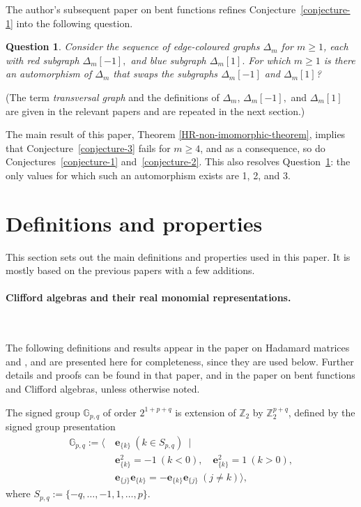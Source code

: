 \documentclass[12pt,a4paper]{article}
\newcommand{\mb}[1]{\mathbb{#1}}
\newcommand{\mf}[1]{\mathbf{#1}}
\newcommand{\G}{\mb{G}}
\newcommand{\Z}{\mb{Z}}
\newtheorem{Question}{Question}
\begin{document}
The author's subsequent paper on bent functions \cite{Leo15Bent} 
refines Conjecture~\ref{conjecture-1} into the following question.
\begin{Question}
\label{Question-1}
Consider the sequence of edge-coloured graphs $\varDelta_m$ for $m \geqslant 1$,
each with red subgraph $\varDelta_m[-1],$ and blue subgraph $\varDelta_m[1].$
For which $m \geqslant 1$ is there an automorphism of $\varDelta_m$ 
that swaps the subgraphs $\varDelta_m[-1]$ and $\varDelta_m[1]$?
\end{Question}
 
(The term \emph{transversal graph} and the definitions of $\varDelta_m$, $\varDelta_m[-1],$ and $\varDelta_m[1]$ 
are given in the relevant papers and are repeated in the next section.)

The main result of this paper, Theorem \ref{HR-non-imomorphic-theorem}, implies that
Conjecture~\ref{conjecture-3} fails for $m \geqslant 4$, and as a consequence, 
so do Conjectures~\ref{conjecture-1} and~\ref{conjecture-2}.
This also resolves Question~\ref{Question-1}: the only values for which such an automorphism exists are 1, 2, and 3.

\section{Definitions and properties}
\label{sec-Preliminaries}
This section sets out the main definitions and properties used in this paper.
It is mostly based on the previous papers \cite{Leo14Constructions, Leo15Bent}
with a few additions.

\paragraph*{Clifford algebras and their real monomial representations.}
\label{sec-Clifford}

~

The following definitions and results appear in the paper on Hada\-mard matrices and  \cite{Leo14Constructions},
and are presented here for completeness, since they are used below. 
Further details and proofs can be found in that paper, and in the paper on bent functions and Clifford algebras,
unless otherwise noted.

The signed group
$\G_{p,q}$ of order $2^{1+p+q}$ 
is extension of $\Z_2$ by $\Z_2^{p+q}$,
defined by the signed group presentation
%
\begin{align*}
\G_{p,q} := \bigg\langle \ 
&\mf{e}_{\{k\}}\ (k \in S_{p,q})\ \mid
\\
&\mf{e}_{\{k\}}^2 = -1\ (k < 0), \quad \mf{e}_{\{k\}}^2 = 1\ (k > 0),
\\
&\mf{e}_{\{j\}}\mf{e}_{\{k\}} = -\mf{e}_{\{k\}}\mf{e}_{\{j\}}\ (j \neq k) \bigg\rangle,
\end{align*}
%
where $S_{p,q} := \{-q,\ldots,-1,1,\ldots,p\}.$
\end{document}
